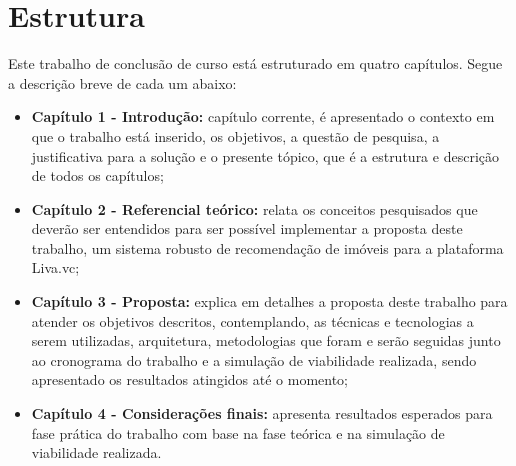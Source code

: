 \section{Estrutura}

Este trabalho de conclusão de curso está estruturado em quatro capítulos. Segue a descrição breve de cada um abaixo:

\begin{itemize}
    \item \textbf{Capítulo 1 - Introdução:} capítulo corrente, é apresentado o contexto em que o trabalho está inserido, os objetivos, a questão de pesquisa, a justificativa para a solução e o presente tópico, que é a estrutura e descrição de todos os capítulos;

    \item \textbf{Capítulo 2 - Referencial teórico:} relata os conceitos pesquisados que deverão ser entendidos para ser possível implementar a proposta deste trabalho, um sistema robusto de recomendação de imóveis para a plataforma Liva.vc;
    
   \item \textbf{Capítulo 3 - Proposta:} explica em detalhes a proposta deste trabalho para atender os objetivos descritos, contemplando, as técnicas e tecnologias a serem utilizadas, arquitetura, metodologias que foram e serão seguidas junto ao cronograma do trabalho e a simulação de viabilidade realizada, sendo apresentado os resultados atingidos até o momento;
   
   \item \textbf{Capítulo 4 - Considerações finais:} apresenta resultados esperados para fase prática do trabalho com base na fase teórica e na simulação de viabilidade realizada.
\end{itemize}
